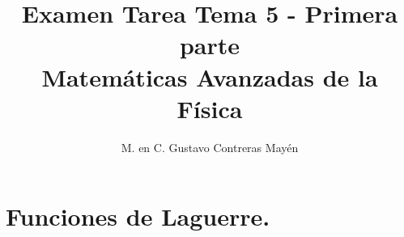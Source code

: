 
\geometry{top=1.25cm, bottom=1.5cm, left=1.25cm, right=0.8cm}
\title{Examen Tarea Tema 5 - Primera parte \\ \large {Matemáticas Avanzadas de la Física}  \vspace{-3ex}}
\author{M. en C. Gustavo Contreras Mayén}
\date{ }

\vspace{-4cm}
\maketitle
\fontsize{14}{14}\selectfont
\section{Funciones de Laguerre.}

